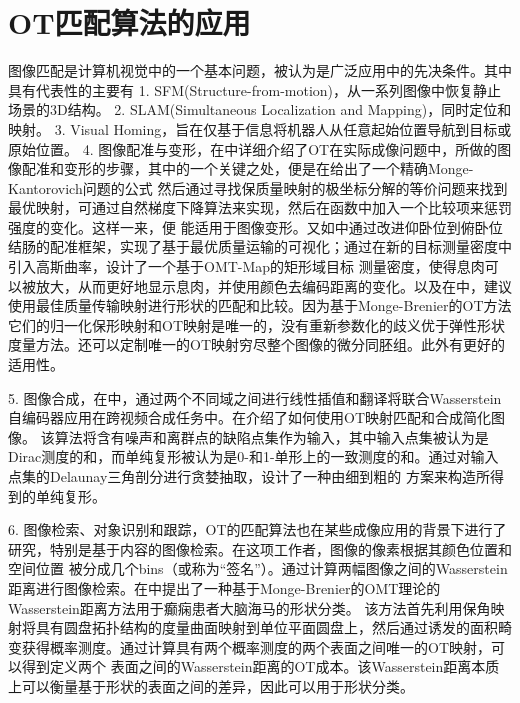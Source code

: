 
\section{OT匹配算法的应用}

图像匹配是计算机视觉中的一个基本问题，被认为是广泛应用中的先决条件。其中具有代表性的主要有
1. SFM(Structure-from-motion)，从一系列图像中恢复静止场景的3D结构。
2. SLAM(Simultaneous Localization and Mapping)，同时定位和映射。
3. Visual Homing，旨在仅基于信息将机器人从任意起始位置导航到目标或原始位置。
4. 图像配准与变形，在\cite{haker2004optimal}中详细介绍了OT在实际成像问题中，所做的图像配准和变形的步骤，其中的一个关键之处，便是在给出了一个精确Monge-Kantorovich问题的公式
然后通过寻找保质量映射的极坐标分解的等价问题来找到最优映射\cite{gangbo1996geometry,mccann2001polar}，可通过自然梯度下降算法来实现，然后在函数中加入一个比较项来惩罚强度的变化。这样一来，便
能适用于图像变形。又如\cite{ma2019supine}中通过改进仰卧位到俯卧位结肠的配准框架，实现了基于最优质量运输的可视化；通过在新的目标测量密度中引入高斯曲率，设计了一个基于OMT-Map的矩形域目标
测量密度，使得息肉可以被放大，从而更好地显示息肉，并使用颜色去编码距离的变化。以及在\cite{su2015optimal}中，建议使用最佳质量传输映射进行形状的匹配和比较。因为基于Monge-Brenier的OT方法
它们的归一化保形映射和OT映射是唯一的，没有重新参数化的歧义优于弹性形状度量方法。还可以定制唯一的OT映射穷尽整个图像的微分同胚组。此外有更好的适用性。

5. 图像合成，在\cite{RN1}中，通过两个不同域之间进行线性插值和翻译将联合Wasserstein自编码器应用在跨视频合成任务中。在\cite{de2011optimal}介绍了如何使用OT映射匹配和合成简化图像。
该算法将含有噪声和离群点的缺陷点集作为输入，其中输入点集被认为是Dirac测度的和，而单纯复形被认为是0-和1-单形上的一致测度的和。通过对输入点集的Delaunay三角剖分进行贪婪抽取，设计了一种由细到粗的
方案来构造所得到的单纯复形。

6. 图像检索、对象识别和跟踪，OT的匹配算法也在某些成像应用的背景下进行了研究，特别是基于内容的图像检索\cite{levina2001earth,rubner2001perceptual,rubner2000earth}。在这项工作者，图像的像素根据其颜色位置和空间位置
被分成几个bins（或称为“签名”）。通过计算两幅图像之间的Wasserstein距离进行图像检索。在\cite{ma2015surface}中提出了一种基于Monge-Brenier的OMT理论的Wasserstein距离方法用于癫痫患者大脑海马的形状分类。
该方法首先利用保角映射将具有圆盘拓扑结构的度量曲面映射到单位平面圆盘上，然后通过诱发的面积畸变获得概率测度。通过计算具有两个概率测度的两个表面之间唯一的OT映射，可以得到定义两个
表面之间的Wasserstein距离的OT成本。该Wasserstein距离本质上可以衡量基于形状的表面之间的差异，因此可以用于形状分类。